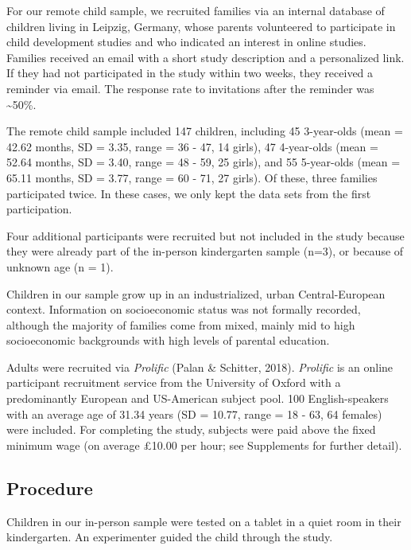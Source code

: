 \documentclass[
  man,floatsintext]{apa6}
\begin{document}
For our remote child sample, we recruited families via an internal database of children living in Leipzig, Germany, whose parents volunteered to participate in child development studies and who indicated an interest in online studies.
Families received an email with a short study description and a personalized link.
If they had not participated in the study within two weeks, they received a reminder via email.
The response rate to invitations after the reminder was \textasciitilde50\%.

The remote child sample included 147 children, including 45 3-year-olds (mean = 42.62 months, SD = 3.35, range = 36 - 47, 14 girls), 47 4-year-olds (mean = 52.64 months, SD = 3.40, range = 48 - 59, 25 girls), and 55 5-year-olds (mean = 65.11 months, SD = 3.77, range = 60 - 71, 27 girls).
Of these, three families participated twice.
In these cases, we only kept the data sets from the first participation.

Four additional participants were recruited but not included in the study because they were already part of the in-person kindergarten sample (n=3), or because of unknown age (n = 1).

Children in our sample grow up in an industrialized, urban Central-European context.
Information on socioeconomic status was not formally recorded, although the majority of families come from mixed, mainly mid to high socioeconomic backgrounds with high levels of parental education.

Adults were recruited via \emph{Prolific} (Palan \& Schitter, 2018).
\emph{Prolific} is an online participant recruitment service from the University of Oxford with a predominantly European and US-American subject pool.
100 English-speakers with an average age of 31.34 years (SD = 10.77, range = 18 - 63, 64 females) were included.
For completing the study, subjects were paid above the fixed minimum wage (on average £10.00 per hour; see Supplements for further detail).

\hypertarget{procedure}{%
\subsection{Procedure}\label{procedure}}

Children in our in-person sample were tested on a tablet in a quiet room in their kindergarten.
An experimenter guided the child through the study.
\end{document}
